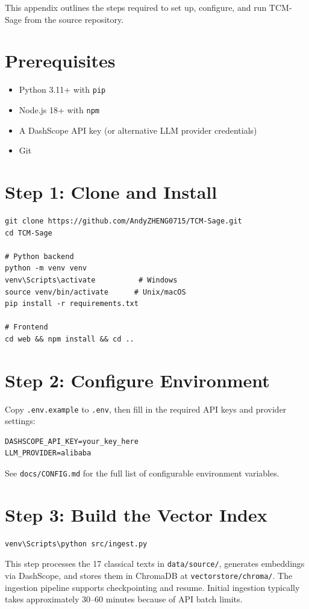 \documentclass[11pt,a4paper]{report}
\begin{document}
This appendix outlines the steps required to set up, configure, and run TCM-Sage from the source repository.

\section*{Prerequisites}
\begin{itemize}
    \item Python 3.11+ with \texttt{pip}
    \item Node.js 18+ with \texttt{npm}
    \item A DashScope API key (or alternative LLM provider credentials)
    \item Git
\end{itemize}

\section*{Step 1: Clone and Install}
\begin{verbatim}
git clone https://github.com/AndyZHENG0715/TCM-Sage.git
cd TCM-Sage

# Python backend
python -m venv venv
venv\Scripts\activate          # Windows
source venv/bin/activate      # Unix/macOS
pip install -r requirements.txt

# Frontend
cd web && npm install && cd ..
\end{verbatim}

\section*{Step 2: Configure Environment}
Copy \texttt{.env.example} to \texttt{.env}, then fill in the required API keys and provider settings:
\begin{verbatim}
DASHSCOPE_API_KEY=your_key_here
LLM_PROVIDER=alibaba
\end{verbatim}
See \texttt{docs/CONFIG.md} for the full list of configurable environment variables.

\section*{Step 3: Build the Vector Index}
\begin{verbatim}
venv\Scripts\python src/ingest.py
\end{verbatim}
This step processes the 17 classical texts in \texttt{data/source/}, generates embeddings via DashScope, and stores them in ChromaDB at \texttt{vectorstore/chroma/}. The ingestion pipeline supports checkpointing and resume. Initial ingestion typically takes approximately 30--60 minutes because of API batch limits.
\end{document}

